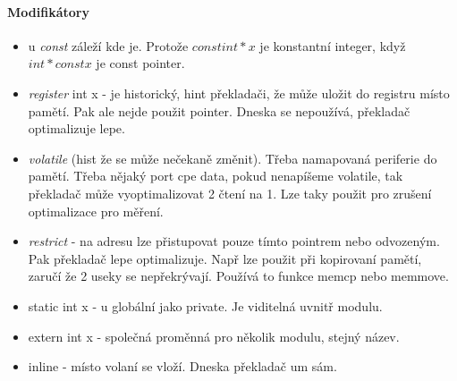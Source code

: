 \paragraph{Modifikátory}
\begin{itemize}
	\item u \emph{const} záleží kde je. Protože $const int *x$ je konstantní integer, když $int * const x$ je const pointer.
	\item \emph{register} int x - je historický, hint překladači, že může uložit do registru místo pamětí.
		Pak ale nejde použit pointer. Dneska se nepoužívá, překladač optimalizuje lepe.
	\item \emph{volatile} (hist že se může nečekaně změnit). Třeba namapovaná periferie do pamětí.
		Třeba nějaký port cpe data, pokud nenapíšeme volatile, tak překladač může vyoptimalizovat 2 čtení na 1.
		Lze taky použit pro zrušení optimalizace pro měření.
	\item \emph{restrict} - na adresu lze přistupovat pouze tímto pointrem nebo odvozeným.
		Pak překladač lepe optimalizuje. Např lze použit při kopirovaní pamětí, zaručí že 2 useky se nepřekrývají.
		Používá to funkce memcp nebo memmove.
	\item static int x - u globální jako private. Je viditelná uvnitř modulu.
	\item extern int x - společná proměnná pro několik modulu, stejný název.
	\item inline - místo volaní se vloží. Dneska překladač um sám.
\end{itemize}
